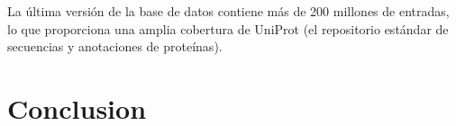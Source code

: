 \documentclass[runningheads]{llncs} %
\begin{document}
La última versión de la base de datos contiene más de 200 millones de entradas, 
lo que proporciona una amplia cobertura de UniProt 
(el repositorio estándar de secuencias y anotaciones de proteínas). 
\cite{ej-alphafold}

\section{Conclusion}

\newpage
\printbibliography
\end{document}
